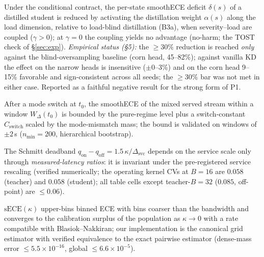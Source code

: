 \documentclass[sigconf,nonacm]{acmart}
\newcommand{\sece}{\mathrm{sECE}}
\newcommand{\delt}{\delta}
\begin{document}
\begin{proposition}[$\delt(s)$ identification and LCD mechanism]
\label{prop:lcd}
Under the conditional contract, the per-state smoothECE deficit
$\delt(s)$ of a distilled student is reduced by activating the
distillation weight $\alpha(s)$ along the load dimension, relative to
load-blind distillation (B3a), when severity--load are coupled
($\gamma>0$); at $\gamma=0$ the coupling yields no advantage
(no-harm; the TOST check of §\ref{sec:exp}).
\emph{Empirical status (§5):} the $\ge 30\%$ reduction is reached
\emph{only} against the blind-oversampling baseline (corn head,
45--82\%); against vanilla KD the effect on the narrow heads is
insensitive ($\pm$0--3\%) and on the corn head 9--15\% favorable and sign-consistent
across all seeds; the $\ge 30\%$ bar was not met in either case. Reported as a
faithful negative result for the strong form of P1.
\end{proposition}

\begin{proposition}
\label{prop:swap}
After a mode switch at $t_0$, the smoothECE of the mixed served stream
within a window $W_\Delta(t_0)$ is bounded by the pure-regime level plus a
switch-constant $C_{\mathrm{switch}}$ scaled by the mode-mismatch mass;
the bound is validated on windows of $\pm2$\,s ($n_{\min}{=}200$,
hierarchical bootstrap).
\end{proposition}

\begin{proposition}
\label{prop:deadband}
The Schmitt deadband $q_{\mathrm{on}}-q_{\mathrm{off}} =
1.5\,\kappa/\Delta_{\mathrm{svc}}$ depends on the service scale only
through \emph{measured-latency ratios}: it is invariant under the
pre-registered service rescaling (verified numerically; the operating
kernel CVs at $B{=}16$ are $0.058$ (teacher) and $0.058$ (student);
all table cells except teacher-$B{=}32$ ($0.085$, off-point) are
$\le 0.06$).
\end{proposition}

\begin{proposition}
\label{prop:sece}
$\sece(\kappa)$ upper-bins binned ECE with bins coarser than the
bandwidth and converges to the calibration surplus of the population as
$\kappa\to 0$ with a rate compatible with Blasiok--Nakkiran; our
implementation is the canonical grid estimator with verified
equivalence to the exact pairwise estimator (dense-mass error
$\le 5.5\times 10^{-16}$, global $\le 6.6\times 10^{-5}$).
\end{proposition}
\end{document}
